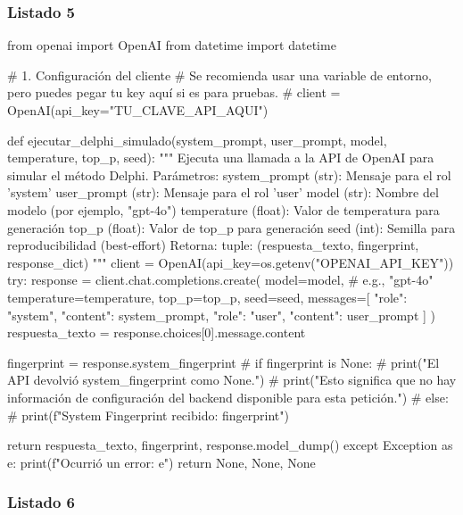 \subsubsection{Listado 5}
\label{anexo:code-6-3-1-1-5}

\begin{APACode}
from openai import OpenAI
from datetime import datetime

# 1. Configuración del cliente
# Se recomienda usar una variable de entorno, pero puedes pegar tu key aquí si es para pruebas.
# client = OpenAI(api_key="TU_CLAVE_API_AQUI")

def ejecutar_delphi_simulado(system_prompt, user_prompt, model, temperature, top_p, seed):
    """
    Ejecuta una llamada a la API de OpenAI para simular el método Delphi.
    Parámetros:
        system_prompt (str): Mensaje para el rol 'system'
        user_prompt (str): Mensaje para el rol 'user'
        model (str): Nombre del modelo (por ejemplo, "gpt-4o")
        temperature (float): Valor de temperatura para generación
        top_p (float): Valor de top_p para generación
        seed (int): Semilla para reproducibilidad (best-effort)
    Retorna:
        tuple: (respuesta_texto, fingerprint, response_dict)
    """
    client = OpenAI(api_key=os.getenv("OPENAI_API_KEY"))
    try:
        response = client.chat.completions.create(
            model=model, # e.g., "gpt-4o"
            temperature=temperature,
            top_p=top_p,
            seed=seed,
            messages=[
                {"role": "system", "content": system_prompt},
                {"role": "user", "content": user_prompt}
            ]
        )
        respuesta_texto = response.choices[0].message.content




        fingerprint = response.system_fingerprint
        # if fingerprint is None:
        #     print("\n[WARN] El API devolvió system_fingerprint como None.")
        #     print("Esto significa que no hay información de configuración del backend disponible para esta petición.")
        # else:
        #     print(f"\n[OK] System Fingerprint recibido: {fingerprint}")

        return respuesta_texto, fingerprint, response.model_dump()
    except Exception as e:
        print(f"Ocurrió un error: {e}")
        return None, None, None
\end{APACode}

\subsubsection{Listado 6}
\label{anexo:code-6-3-1-1-6}

